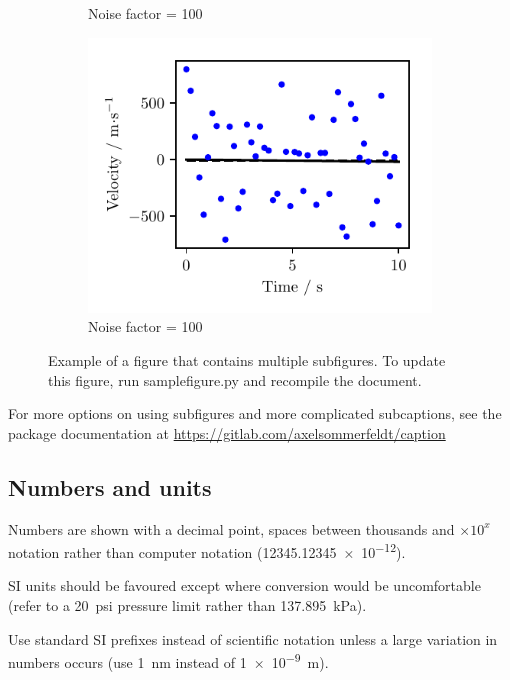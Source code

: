 \begin{figure}[htbp]
\begin{subfigure}[b]{0.5\textwidth}
		\caption{Noise factor = \num{100}}\label{fig:1e}
	\end{subfigure}\hfill
	\begin{subfigure}[b]{0.5\textwidth}
		\centering
    \includegraphics{Figures/noise_100_derivative.pdf}
		\caption{Noise factor = \num{100}}\label{fig:1f}
	\end{subfigure}
	\caption[Short caption which will be in the table of figures]{Example of a figure that contains multiple subfigures.  To update this figure, run samplefigure.py and recompile the document.}
	\label{fig:subcaptionfigure}
\end{figure}

For more options on using subfigures and more complicated subcaptions, see the package documentation at \url{https://gitlab.com/axelsommerfeldt/caption} 

\subsection{Numbers and units}
Numbers are shown with a decimal point, spaces between thousands and $\times 10^x$ notation rather than computer notation (\num{12345.12345e-12}).

SI units should be favoured except where conversion would be
uncomfortable (refer to a \SI{20}{psi} pressure limit rather than
\SI{137.895}{\kilo\pascal}).

Use standard SI prefixes instead of scientific notation unless a large variation in
numbers occurs (use \SI{1}{\nano\meter} instead of \SI{1e-9}{\meter}).